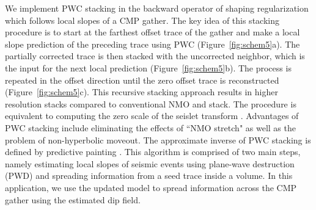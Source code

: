 We implement PWC stacking in the backward operator of shaping regularization which follows
local slopes of a CMP gather. The key idea of this stacking procedure is
to start at the farthest offset trace of the gather and make a local slope prediction of the preceding trace using 
PWC (Figure~\ref{fig:schem5}a). The partially corrected trace is then stacked with the uncorrected neighbor, 
which is the input for the next local prediction (Figure~\ref{fig:schem5}b). The process is repeated in the 
offset direction until the zero offset trace is reconstructed (Figure~\ref{fig:schem5}c). 
This recursive stacking approach results in higher resolution stacks compared 
to conventional NMO and stack. The procedure is equivalent to computing the zero scale of the seislet transform 
\cite[]{fomel3}. Advantages of PWC stacking include eliminating 
the effects of ``NMO stretch" as well as the problem of non-hyperbolic moveout. 
The approximate inverse of PWC stacking is defined by predictive painting \cite[]{fomel6}. 
This algorithm is comprised of two main steps, namely estimating 
local slopes of seismic events using plane-wave destruction (PWD) \cite[]{fomel5} and spreading information from a seed 
trace inside a volume. In this application, we use the updated model to spread information 
across the CMP gather using the estimated dip field.



